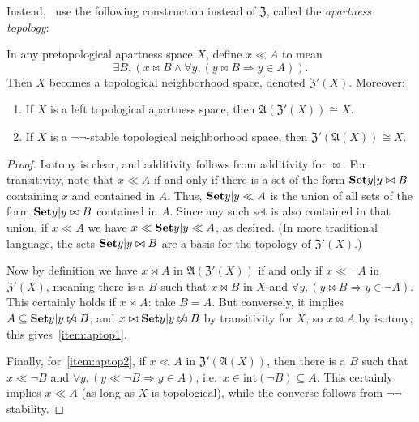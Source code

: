 \documentclass{article}
\def\int{\mathrm{int}}
\def\cpl#1{\neg #1}
\let\implies\Rightarrow
\def\anti{\mathfrak{A}}
\def\neigh{\mathfrak{Z}}
\def\nn{\ensuremath{\neg\neg}}
\begin{document}
Instead,~\cite{bridges-vita} use the following construction instead of $\neigh$, called the \emph{apartness topology}:

\begin{thm}\label{thm:aptop}
  In any pretopological apartness space $X$, define $x\ll A$ to mean
  \begin{equation}
    \label{eq:top-bowtie-ll-1}
    \exists B, (x\bowtie B \land \forall y, (y\bowtie B \implies y\in A)).
  \end{equation}
  Then $X$ becomes a topological neighborhood space, denoted $\neigh'(X)$.
  Moreover:
  \begin{enumerate}
  \item If $X$ is a left topological apartness space, then $\anti(\neigh'(X)) \cong X$.\label{item:aptop1}
  \item If $X$ is a \nn-stable topological neighborhood space, then $\neigh'(\anti(X)) \cong X$.\label{item:aptop2}
  \end{enumerate}
\end{thm}
\begin{proof}
  Isotony is clear, and additivity follows from additivity for $\bowtie$.
  For transitivity, note that $x\ll A$ if and only if there is a set of the form $\setof{y|y\bowtie B}$ containing $x$ and contained in $A$.
  Thus, $\setof{y|y\ll A}$ is the union of all sets of the form $\setof{y|y\bowtie B}$ contained in $A$.
  Since any such set is also contained in that union, if $x\ll A$ we have $x\ll \setof{y|y\ll A}$, as desired.
  (In more traditional language, the sets $\setof{y|y\bowtie B}$ are a basis for the topology of $\neigh'(X)$.)

  Now by definition we have $x\bowtie A$ in $\anti(\neigh'(X))$ if and only if $x\ll \cpl{A}$ in $\neigh'(X)$, meaning there is a $B$ such that $x\bowtie B$ in $X$ and $\forall y, (y\bowtie B \implies y\in \cpl{A})$.
  This certainly holds if $x\bowtie A$: take $B=A$.
  But conversely, it implies $A\subseteq \setof{y|y\not\bowtie B}$, and $x\bowtie\setof{y|y\not\bowtie B}$ by transitivity for $X$, so $x\bowtie A$ by isotony; this gives~\ref{item:aptop1}.

  Finally, for~\ref{item:aptop2}, if $x \ll A$ in $\neigh'(\anti(X))$, then there is a $B$ such that $x\ll \cpl{B}$ and $\forall y, (y\ll \cpl{B} \implies y\in A)$, i.e.\ $x\in \int(\cpl{B}) \subseteq A$.
  This certainly implies $x\ll A$ (as long as $X$ is topological), while the converse follows from \nn-stability.
\end{proof}
\end{document}
